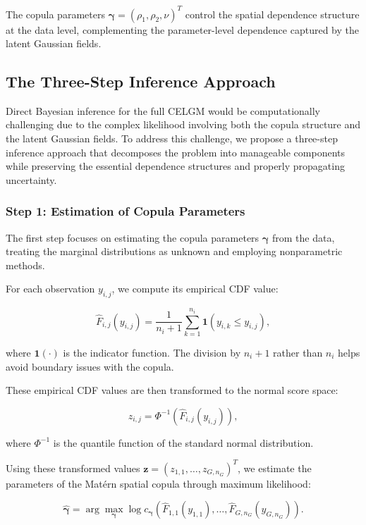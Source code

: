 The copula parameters $\boldsymbol{\gamma} = (\rho_1, \rho_2, \nu)^T$ control the spatial dependence structure at the data level, complementing the parameter-level dependence captured by the latent Gaussian fields.

\subsection{The Three-Step Inference Approach}
Direct Bayesian inference for the full CELGM would be computationally challenging due to the complex likelihood involving both the copula structure and the latent Gaussian fields. To address this challenge, we propose a three-step inference approach that decomposes the problem into manageable components while preserving the essential dependence structures and properly propagating uncertainty.

\subsubsection{Step 1: Estimation of Copula Parameters}
The first step focuses on estimating the copula parameters $\boldsymbol{\gamma}$ from the data, treating the marginal distributions as unknown and employing nonparametric methods.

For each observation $y_{i,j}$, we compute its empirical CDF value:

\begin{equation}
    \hat{F}_{i,j}(y_{i,j}) = \frac{1}{n_i + 1} \sum_{k=1}^{n_i} \mathbf{1}(y_{i,k} \leq y_{i,j}),
\end{equation}

where $\mathbf{1}(\cdot)$ is the indicator function. The division by $n_i + 1$ rather than $n_i$ helps avoid boundary issues with the copula.

These empirical CDF values are then transformed to the normal score space:

\begin{equation}
    z_{i,j} = \Phi^{-1}(\hat{F}_{i,j}(y_{i,j})),
\end{equation}

where $\Phi^{-1}$ is the quantile function of the standard normal distribution.

Using these transformed values $\mathbf{z} = (z_{1,1}, \ldots, z_{G,n_G})^T$, we estimate the parameters of the Matérn spatial copula through maximum likelihood:

\begin{equation}
    \hat{\boldsymbol{\gamma}} = \arg\max_{\boldsymbol{\gamma}} \log c_{\boldsymbol{\gamma}}(\hat{F}_{1,1}(y_{1,1}), \ldots, \hat{F}_{G,n_G}(y_{G,n_G})).
\end{equation}

